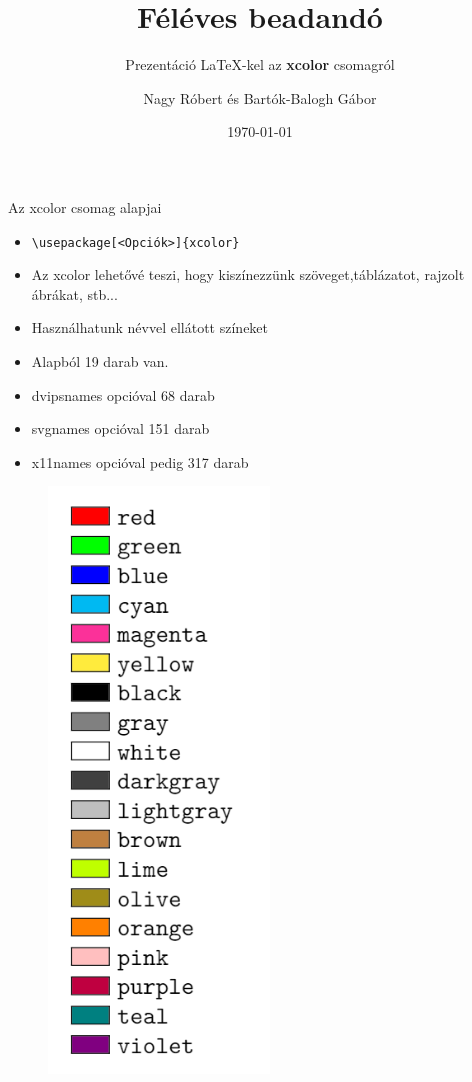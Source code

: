 \documentclass[aspectratio=1610,dvipsnames,xcolor=table]{beamer}
\begin{document}
\title{Féléves beadandó}
\author{Nagy Róbert és Bartók-Balogh Gábor}
\date{\today}
\subtitle{Prezentáció  \LaTeX-kel az \textbf{xcolor} csomagról}

\frame[plain]{\maketitle}

    
\begin{frame}[fragile]{Az xcolor csomag alapjai}
    \begin{minipage}{0.6\textwidth}
        \begin{itemize}
           \item {}\verb!\usepackage[<Opciók>]{xcolor}!
           \item {}Az xcolor lehetővé teszi, hogy kiszínezzünk 					                              szöveget,táblázatot, rajzolt ábrákat, stb... 
           \item {}Használhatunk névvel ellátott színeket
           \item {}Alapból 19 darab van.
           \item {}dvipsnames opcióval 68 darab
           \item {}svgnames opcióval 151 darab 
           \item {}x11names opcióval pedig 317 darab
        \end{itemize}
     \end{minipage} \hfill
\begin{minipage}{0.35\textwidth}    
            \begin{figure}
                \includegraphics[scale=0.4]{img/szinek.png}

\end{figure}
\end{minipage}
\end{frame}
\end{document}
